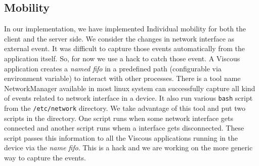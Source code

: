 \subsection{Mobility}
In our implementation, we have implemented Individual mobility for both the client and the server side. We consider the changes in network interface as external event. It was difficult to capture those events automatically from the application itself. So, for now we use a hack to catch those event. A Viscous application creates a {\it named fifo} in a predefined path (configurable via environment variable) to interact with other processes. There is a tool name NetworkManager available in most linux system can successfully capture all kind of events related to network interface in a  device. It also run various {\tt bash} script from the {\tt /etc/network} directory. We take advantage of this tool and put two scripts in the directory. One script runs when some network interface gets connected and another script runs whem a interface gets disconnected. These script passes this information to all the Viscous applications running in the device via the {\it name fifo}. This is a hack and we are working on the more generic way to capture the events.


